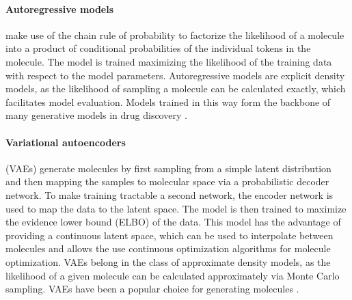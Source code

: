 \paragraph{Autoregressive models} make use of the chain rule of probability to factorize the
likelihood of a molecule into a product of conditional probabilities of the individual tokens in the
molecule. The model is trained maximizing the likelihood of the training data with respect to the
model parameters. Autoregressive models are explicit density models, as the likelihood of sampling a
molecule can be calculated exactly, which facilitates model evaluation. Models trained in this way
form the backbone of many generative models in drug discovery
\citep{gomez-bombarelliAutomaticChemicalDesign2018,seglerGeneratingFocusedMolecule2018,olivecronaMolecularDenovoDesign2017,guoAugmentedMemoryCapitalizing2023,thomasAugmentedHillClimbIncreases2022,jaquesSequenceTutorConservative2016,cohen-karlikOvercomingOrderAutoregressive2024}.

\paragraph{Variational autoencoders} (VAEs) \citep{kingmaAutoEncodingVariationalBayes2013} generate molecules by first
sampling from a simple latent distribution and then mapping the samples to molecular space
via a probabilistic decoder network. To make training tractable a second network, the
encoder network is used to map the data to the latent space. The model is then trained to
maximize the evidence lower bound (ELBO) of the data.
This model has the advantage of providing a continuous latent space, which can be used to
interpolate between molecules and allows the use continuous optimization algorithms for molecule
optimization. VAEs belong in the class of approximate density models, as the likelihood of a given
molecule can be calculated approximately via Monte Carlo sampling. VAEs have been a popular choice
for generating molecules
\citep{gomez-bombarelliAutomaticChemicalDesign2018,kusnerGrammarVariationalAutoencoder2017,simonovskyGraphVAEGenerationSmall2018,samantaNeVAEDeepGenerative2018,jinJunctionTreeVariational2018,daiSyntaxDirectedVariationalAutoencoder2018,liuConstrainedGraphVariational2018}.

